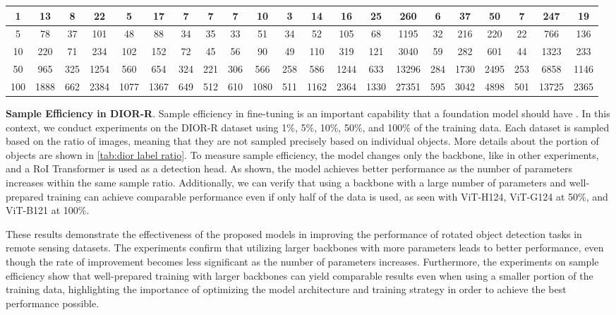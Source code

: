 \begin{table*}[t]{\textwidth=0mm}
{\begin{tabular}{c|c c c c c c c c c c c c c c c c c c c c}
        1  & 13 & 8 & 22 & 5 & 17 & 7 & 7 & 7 & 10 & 3 & 14 & 16 & 25 & 260 & 6 & 37 & 50 & 7 & 247 & 19 \\ \hline

        5  & 78 & 37 & 101 & 48 & 88 & 34 & 35 & 33 & 51 & 34 & 52 & 105 & 68 & 1195 & 32 & 216 & 220 & 22 & 766 & 136 \\ \hline
        10  & 220 & 71 & 234 & 102 & 152 & 72 & 45 & 56 & 90 & 49 & 110 & 319 & 121 & 3040 & 59 & 282 & 601 & 44 & 1323 & 233 \\ \hline
        50  & 965 & 325 & 1254 & 560 & 654 & 324 & 221 & 306 & 566 & 258 & 586 & 1244 & 633 & 13296 & 284 & 1730 & 2495 & 253 & 6858 & 1146 \\ \hline
        100  & 1888 & 662 & 2384 & 1077 & 1367 & 649 & 512 & 610 & 1080 & 511 & 1162 & 2364 & 1330 & 27351 & 595 & 3042 & 4898 & 501 & 13725 & 2365 \\ \hline
        
    \end{tabular}
    }
    \label{tab:dior label ratio}
\end{table*} 
\textbf{Sample Efficiency in DIOR-R}. Sample efficiency in fine-tuning is an important capability that a foundation model should have \cite{zhang2023vitaev2, bommasani2021opportunities, brown2020language, kim2022fine}. In this context, we conduct experiments on the DIOR-R dataset using 1\%, 5\%, 10\%, 50\%, and 100\% of the training data. Each dataset is sampled based on the ratio of images, meaning that they are not sampled precisely based on individual objects. More details about the portion of objects are shown in \autoref{tab:dior label ratio}. To measure sample efficiency, the model changes only the backbone, like in other experiments, and a RoI Transformer is used as a detection head. As shown, the model achieves better performance as the number of parameters increases within the same sample ratio. Additionally, we can verify that using a backbone with a large number of parameters and well-prepared training can achieve comparable performance even if only half of the data is used, as seen with ViT-H124, ViT-G124 at 50\%, and ViT-B121 at 100\%.

These results demonstrate the effectiveness of the proposed models in improving the performance of rotated object detection tasks in remote sensing datasets. The experiments confirm that utilizing larger backbones with more parameters leads to better performance, even though the rate of improvement becomes less significant as the number of parameters increases. Furthermore, the experiments on sample efficiency show that well-prepared training with larger backbones can yield comparable results even when using a smaller portion of the training data, highlighting the importance of optimizing the model architecture and training strategy in order to achieve the best performance possible.

